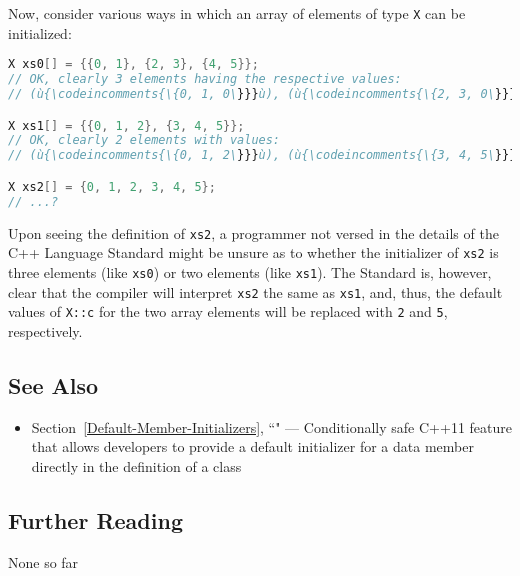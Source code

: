 \noindent Now, consider various ways in which an array of elements of type
\texttt{X} can be initialized:

\begin{lstlisting}[language=C++]
X xs0[] = {{0, 1}, {2, 3}, {4, 5}};
// OK, clearly 3 elements having the respective values:
// (ù{\codeincomments{\{0, 1, 0\}}}ù), (ù{\codeincomments{\{2, 3, 0\}}}ù), (ù{\codeincomments{\{4, 5, 0\}}}ù)

X xs1[] = {{0, 1, 2}, {3, 4, 5}};
// OK, clearly 2 elements with values:
// (ù{\codeincomments{\{0, 1, 2\}}}ù), (ù{\codeincomments{\{3, 4, 5\}}}ù)

X xs2[] = {0, 1, 2, 3, 4, 5};
// ...?
\end{lstlisting}

\noindent Upon seeing the definition of \texttt{xs2}, a programmer not versed in
the details of the C++ Language Standard might be unsure as to whether the
initializer of \texttt{xs2} is three elements (like \texttt{xs0}) or two
elements (like \texttt{xs1}). The Standard is, however, clear that the
compiler will interpret \texttt{xs2} the same as \texttt{xs1}, and,
thus, the default values of \texttt{X::c} for the two array elements
will be replaced with \texttt{2} and \texttt{5}, respectively.

\subsection[See Also]{See Also}\label{see-also}

\begin{itemize}
\item{Section~\ref{Default-Member-Initializers}, ``" — Conditionally safe C++11 feature that allows developers to provide a default initializer for a data member directly in the definition of a class}
\end{itemize}

\subsection[Further Reading]{Further Reading}\label{further-reading}

None so far

